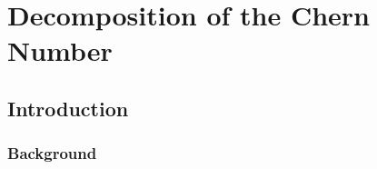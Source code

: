 \chapter{Decomposition of the Chern Number}

\ifpdf
    \graphicspath{{Chapter2/Chapter2Figs/PNG/}{Chapter2/Chapter2/PDF/}{Chapter2/Chapter2Figs/}}
\else
    \graphicspath{{Chapter2/Chapter2Figs/EPS/}{Chapter2/Chapter2/}}
\fi

\section{Introduction}


\subsection{Background}





